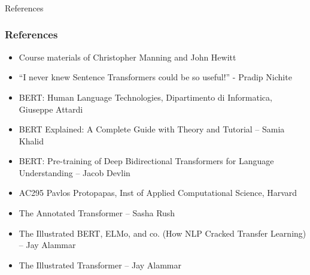 \begin{frame}[fragile]\frametitle{}
\begin{center}
{\Large References}
\end{center}
\end{frame}

\begin{frame}[fragile]\frametitle{References}
		\begin{itemize}
		\item Course materials of Christopher Manning and John Hewitt
		\item ``I never knew Sentence Transformers could be so useful!'' - Pradip Nichite
		\item BERT: Human Language Technologies, Dipartimento di Informatica, Giuseppe Attardi
		\item BERT Explained: A Complete Guide with Theory and Tutorial – Samia Khalid
		\item BERT: Pre-training of Deep Bidirectional Transformers for Language Understanding – Jacob Devlin
		\item AC295 Pavlos Protopapas, Inst of Applied Computational Science, Harvard
		\item The Annotated Transformer – Sasha Rush
		\item The Illustrated BERT, ELMo, and co. (How NLP Cracked Transfer Learning) – Jay Alammar
		\item The Illustrated Transformer – Jay Alammar
		\end{itemize}
\end{frame}



